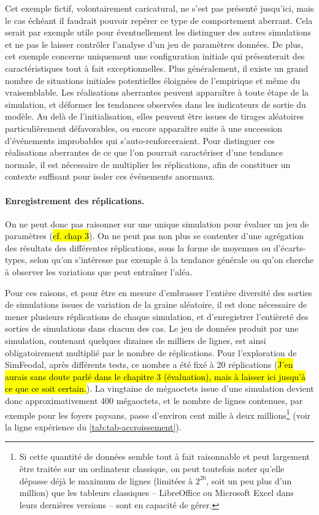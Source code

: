 Cet exemple fictif, volontairement caricatural, ne s'est pas présenté jusqu'ici, mais le cas échéant il faudrait pouvoir repérer ce type de comportement aberrant.
Cela serait par exemple utile pour éventuellement les distinguer des autres simulations et ne pas le laisser contrôler l'analyse d'un jeu de paramètres données.
De plus, cet exemple concerne uniquement une configuration initiale qui présenterait des caractéristiques tout à fait exceptionnelles.
Plus généralement, il existe un grand nombre de situations initiales potentielles éloignées de l'empirique et même du vraisemblable.
Les réalisations aberrantes peuvent apparaître à toute étape de la simulation, et déformer les tendances observées dans les indicateurs de sortie du modèle.
Au delà de l'initialisation, elles peuvent être issues de tirages aléatoires particulièrement défavorables, ou encore apparaître suite à une succession d'événements improbables qui s'auto-renforceraient.
Pour distinguer ces réalisations aberrantes de ce que l'on pourrait caractériser d'une tendance normale, il est nécessaire de multiplier les réplications, afin de constituer un contexte suffisant pour isoler ces événements anormaux.

\paragraph{Enregistrement des réplications.}

On ne peut donc pas raisonner sur une unique simulation pour évaluer un jeu de paramètres (\hl{cf. chap 3}).
On ne peut pas non plus se contenter d'une agrégation des résultats des différentes réplications, sous la forme de moyennes ou d'écarts-types, selon qu'on s'intéresse par exemple à la tendance générale ou qu'on cherche à observer les variations que peut entraîner l'aléa.

Pour ces raisons, et pour être en mesure d'embrasser l'entière diversité des sorties de simulations issues de variation de la graine aléatoire, il est donc nécessaire de mener plusieurs réplications de chaque simulation, et d'enregistrer l'entièreté des sorties de simulations dans chacun des cas.
Le jeu de données produit par une simulation, contenant quelques dizaines de milliers de lignes, est ainsi obligatoirement multiplié par le nombre de réplications.
Pour l'exploration de SimFeodal, après différents tests, ce nombre a été fixé à 20 réplications (\hl{J'en aurais sans doute parlé dans le chapitre 3 (évaluation), mais à laisser ici jusqu'à ce que ce soit certain.}).
La vingtaine de mégaoctets issue d'une simulation devient donc approximativement 400 mégaoctets, et le nombre de lignes contenues, par exemple pour les foyers paysans, passe d'environ cent mille à deux millions\footnote{
	Si cette quantité de données semble tout à fait raisonnable et peut largement être traitée sur un ordinateur classique, on peut toutefois noter qu'elle dépasse déjà le maximum de lignes (limitées à $2^{20}$, soit un peu plus d'un million) que les tableurs classiques -- LibreOffice ou Microsoft Excel dans leurs dernières versions -- sont en capacité de gérer.
} (voir la ligne \og expérience\fg{} du \cref{tab:tab-accroissement}).

